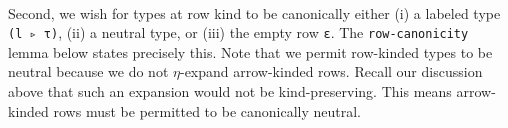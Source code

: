 \documentclass[authoryear, acmsmall, screen, review, nonacm]{acmart}
\begin{document}
\begin{code}%
\>[0]\AgdaSpace{}%
\AgdaSymbol{:}\AgdaSpace{}%
\AgdaSymbol{(}\AgdaSpace{}%
\AgdaSymbol{:}\AgdaSpace{}%
\AgdaSpace{}%
\AgdaSpace{}%
\AgdaSymbol{(}\AgdaSpace{}%
\AgdaSpace{}%
\AgdaSymbol{))}\AgdaSpace{}%
\AgdaSpace{}%
\AgdaFunction{∃[}\AgdaSpace{}%
\AgdaSpace{}%
\AgdaFunction{]}\AgdaSpace{}%
\AgdaSymbol{(}\AgdaSpace{}%
\AgdaSpace{}%
\AgdaSpace{}%
\AgdaSymbol{)}\<%
\\
\>[0]\AgdaSpace{}%
\AgdaSymbol{(}\AgdaSpace{}%
\AgdaSymbol{)}\AgdaSpace{}%
\AgdaSymbol{=}\AgdaSpace{}%
\AgdaSpace{}%
\AgdaOperator{\AgdaInductiveConstructor{,}}\AgdaSpace{}%
\<%
\end{code}

Second, we wish for types at row kind to be canonically either (i) a labeled type \verb!(l ▹ τ)!, (ii) a neutral type, or (iii) the empty row \verb!ε!. The \verb!row-canonicity! lemma below states precisely this. Note that we permit row-kinded types to be neutral because we do not $\eta$-expand arrow-kinded rows. Recall our discussion above that such an expansion would not be kind-preserving. This means arrow-kinded rows must be permitted to be canonically neutral.
\end{document}
